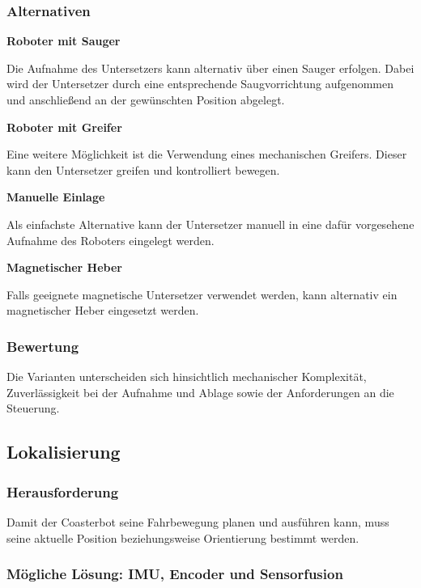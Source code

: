 \subsubsection{Alternativen}\label{alternativen-3}

\textbf{Roboter mit Sauger}

Die Aufnahme des Untersetzers kann alternativ über einen Sauger
erfolgen. Dabei wird der Untersetzer durch eine entsprechende
Saugvorrichtung aufgenommen und anschließend an der gewünschten Position
abgelegt.

\textbf{Roboter mit Greifer}

Eine weitere Möglichkeit ist die Verwendung eines mechanischen Greifers.
Dieser kann den Untersetzer greifen und kontrolliert bewegen.

\textbf{Manuelle Einlage}

Als einfachste Alternative kann der Untersetzer manuell in eine dafür
vorgesehene Aufnahme des Roboters eingelegt werden.

\textbf{Magnetischer Heber}

Falls geeignete magnetische Untersetzer verwendet werden, kann
alternativ ein magnetischer Heber eingesetzt werden.

\subsubsection{Bewertung}\label{bewertung-3}

Die Varianten unterscheiden sich hinsichtlich mechanischer Komplexität,
Zuverlässigkeit bei der Aufnahme und Ablage sowie der Anforderungen an
die Steuerung.

\subsection{Lokalisierung}\label{lokalisierung}

\subsubsection{Herausforderung}\label{herausforderung-4}

Damit der Coasterbot seine Fahrbewegung planen und ausführen kann, muss
seine aktuelle Position beziehungsweise Orientierung bestimmt werden.

\subsubsection{Mögliche Lösung: IMU, Encoder und
Sensorfusion}\label{muxf6gliche-luxf6sung-imu-encoder-und-sensorfusion}

